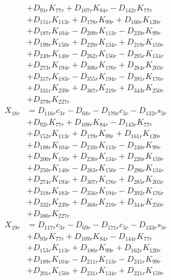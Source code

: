 \begin{multicols}{2}
\begin{align}
&+ D_{91r}K_{77r} + D_{107r}K_{84r} - D_{142r}K_{77r}  \nonumber \\
&+ D_{151r}K_{113r} + D_{178r}K_{99r} + D_{160r}K_{120r}  \nonumber \\
&+ D_{187r}K_{104r} - D_{209r}K_{113r} - D_{239r}K_{99r}  \nonumber \\
&+ D_{199r}K_{150r} + D_{229r}K_{134r} + D_{219r}K_{159r}  \nonumber \\
&+ D_{249r}K_{140r} - D_{262r}K_{150r} - D_{295r}K_{134r}  \nonumber \\
&+ D_{273r}K_{194r} + D_{306r}K_{176r} + D_{284r}K_{203r}  \nonumber \\
&+ D_{317r}K_{183r} - D_{355r}K_{194r} - D_{391r}K_{176r}  \nonumber \\
&+ D_{331r}K_{239r} + D_{367r}K_{219r} + D_{343r}K_{250r}  \nonumber \\
&+ D_{379r}K_{227r} \nonumber \\
X_{18r} &= D_{116r}c_{3r} - D_{68r} - D_{170r}c_{3r} - D_{132r}s_{3r}  \nonumber \\
&+ D_{92r}K_{77r} + D_{108r}K_{84r} - D_{143r}K_{77r}  \nonumber \\
&+ D_{152r}K_{113r} + D_{179r}K_{99r} + D_{161r}K_{120r}  \nonumber \\
&+ D_{188r}K_{104r} - D_{210r}K_{113r} - D_{240r}K_{99r}  \nonumber \\
&+ D_{200r}K_{150r} + D_{230r}K_{134r} + D_{220r}K_{159r}  \nonumber \\
&+ D_{250r}K_{140r} - D_{263r}K_{150r} - D_{296r}K_{134r}  \nonumber \\
&+ D_{274r}K_{194r} + D_{307r}K_{176r} + D_{285r}K_{203r}  \nonumber \\
&+ D_{318r}K_{183r} - D_{356r}K_{194r} - D_{392r}K_{176r}  \nonumber \\
&+ D_{332r}K_{239r} + D_{368r}K_{219r} + D_{344r}K_{250r}  \nonumber \\
&+ D_{380r}K_{227r} \nonumber \\
X_{19r} &= D_{117r}c_{3r} - D_{69r} - D_{171r}c_{3r} - D_{133r}s_{3r}  \nonumber \\
&+ D_{93r}K_{77r} + D_{109r}K_{84r} - D_{144r}K_{77r}  \nonumber \\
&+ D_{153r}K_{113r} + D_{180r}K_{99r} + D_{162r}K_{120r}  \nonumber \\
&+ D_{189r}K_{104r} - D_{211r}K_{113r} - D_{241r}K_{99r}  \nonumber \\
&+ D_{201r}K_{150r} + D_{231r}K_{134r} + D_{221r}K_{159r}  \nonumber \\

\end{align}
\end{multicols}
